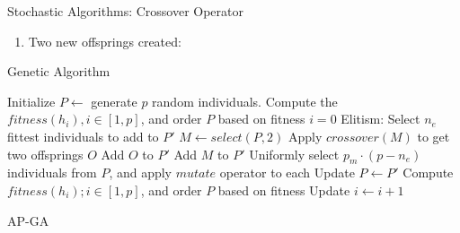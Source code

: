 \documentclass{beamer}
\def\HiLi{\leavevmode\rlap{\hbox to \hsize{\color{green!50}\leaders\hrule height .8\baselineskip depth .5ex\hfill}}}
\begin{document}
\begin{frame}[t]{Stochastic Algorithms: Crossover Operator}
\begin{enumerate}
    \item Two new offsprings created:\par
            \begin{minipage}[t]{\linewidth}
                \centering
            \end{minipage}
    \end{enumerate}
\end{frame}



\begin{frame}{Genetic Algorithm}
    \begin{spacing}{0.6}
        \fontsize{8}{12}\selectfont
        \begin{algorithm}[H]
            Initialize $P\leftarrow$ generate $p$ random individuals.
            Compute the $fitness(h_i), i \in [1,p]$, and order $P$ based on fitness\;
            $i=0$ \;
             {
                Elitism: Select $n_e$ fittest individuals to add to $P'$ \;
                 {
                    $M \leftarrow select(P, 2)$\;
                    \HiLi {} {
                        Apply $crossover(M)$ to get two offsprings $O$ \;
                        Add $O$ to $P'$ \;
                    }
                    { Add $M$ to $P'$ \; }
                }
                Uniformly select $p_{m} \cdot (p - n_e)$ individuals from $P$, and apply $mutate$ operator to each \;
                Update $P\leftarrow P'$ \;
                Compute $fitness(h_i); i \in [1, p]$, and order $P$ based on fitness \;
                Update $i \leftarrow i + 1$ \;
            }
            \caption{AP-GA}
        \end{algorithm}
    \end{spacing}
\end{frame}
\end{document}
